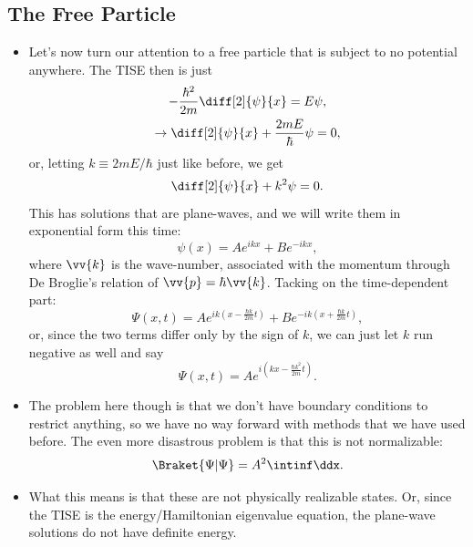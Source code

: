 \subsection*{The Free Particle}

\begin{itemize}
    \item Let's now turn our attention to a free particle that is subject to no potential anywhere. The TISE then is just
        \begin{gather*}
            -\frac{\hbar^2}{2m}\diff[2]{\psi}{x} = E\psi, \\
            \rightarrow \diff[2]{\psi}{x} + \frac{2mE}{\hbar}\psi = 0,
        \end{gather*}
        or, letting $k \equiv 2mE/\hbar$ just like before, we get
        \begin{equation*}
            \diff[2]{\psi}{x} + k^2\psi = 0.
        \end{equation*}
        This has solutions that are plane-waves, and we will write them in exponential form this time:
        \begin{equation*}
            \psi(x) = Ae^{ikx} + Be^{-ikx},
        \end{equation*}
        where $\vv{k}$ is the wave-number, associated with the momentum through De Broglie's relation of $\vv{p} = \hbar\vv{k}$. Tacking on the time-dependent part:
        \begin{equation}
            \Psi(x,t) = Ae^{ik(x - \frac{\hbar k}{2m}t)} + Be^{-ik(x + \frac{\hbar k}{2m}t)},
        \end{equation}
        or, since the two terms differ only by the sign of $k$, we can just let $k$ run negative as well and say
        \begin{equation*}
            \Psi(x,t) = Ae^{i(kx - \frac{\hbar k^2}{2m}t)}.
        \end{equation*}
    \item The problem here though is that we don't have boundary conditions to restrict anything, so we have no way forward with methods that we have used before. The even more disastrous problem is that this is not normalizable:
        \begin{equation*}
            \Braket{\Psi | \Psi} = A^2 \intinf \ddx.
        \end{equation*}
    \item What this means is that these are not physically realizable states. Or, since the TISE is the energy/Hamiltonian eigenvalue equation, the plane-wave solutions do not have definite energy.

\end{itemize}
